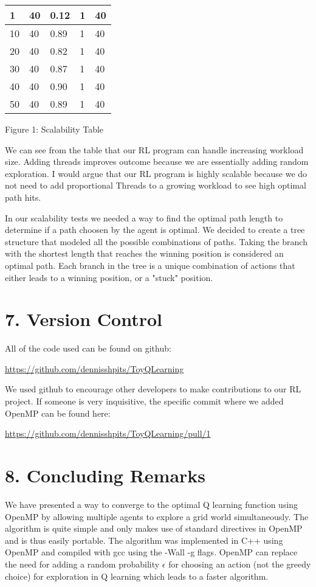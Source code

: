 \documentclass[12pt]{article}
\begin{document}
\begin{center}
\begin{tabular}{|l|l|l|l|l|}
\hline
1       & 40        & 0.12                   & 1                & 40                \\ 
\hline
10      & 40        & 0.89                   & 1                & 40                \\ 
\hline
20      & 40        & 0.82                   & 1                & 40                \\ 
\hline
30      & 40        & 0.87                   & 1                & 40                \\ 
\hline
40      & 40        & 0.90                   & 1                & 40                \\ 
\hline
50      & 40        & 0.89                   & 1                & 40                \\
\hline
\end{tabular}
\caption{Figure 1: Scalability Table}
\end{center}

We can see from the table that our RL program can handle
increasing workload size. Adding threads improves outcome because we are essentially adding random exploration. I would argue that our RL
program is highly scalable because we do not need to add 
proportional Threads to a growing workload to see high
optimal path hits.

In our scalability tests we needed a way to find the optimal path
length to determine if a path choosen by the agent is optimal. 
We decided to create a tree structure that modeled all the possible
combinations of paths. Taking the branch with the shortest length that 
reaches the winning position is considered an optimal path. Each 
branch in the tree is a unique combination of actions that either
leads to a winning position, or a "stuck" position.

\section*{7. Version Control}
All of the code used can be found on github:

\url{https://github.com/dennisshpits/ToyQLearning}

We used github to encourage other developers to make contributions
to our RL project. If someone is very inquisitive, the specific
commit where we added OpenMP can be found here:

\url{https://github.com/dennisshpits/ToyQLearning/pull/1}

\section*{8. Concluding Remarks}
We have presented a way to converge to the optimal Q learning function
using OpenMP by allowing multiple agents to explore a grid world simultaneously.
The algorithm is quite
simple and only makes use of standard directives in OpenMP
and is thus easily portable. The algorithm was implemented
in C++ using OpenMP and compiled with gcc using the -Wall -g flags.
OpenMP can replace the need for adding a random probability $\epsilon$
for choosing an action (not the greedy choice) for exploration in Q learning which 
leads to a faster algorithm.
\end{document}
